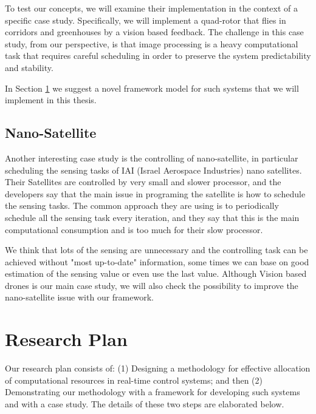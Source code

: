 \documentclass[11pt]{article}
\begin{document}
To test our concepts, we will examine their implementation in the context of a specific case study. Specifically, we will implement a quad-rotor that flies in corridors and greenhouses by a vision based feedback. The challenge in this case study, from our perspective, is that image processing is a heavy computational task that requires careful scheduling in order to preserve the system predictability and stability.

In Section \ref{sec:Research Plan} we suggest a novel framework model for such systems that we will implement in this thesis.

\subsection{Nano-Satellite}
Another interesting case study is the controlling of nano-satellite, in particular scheduling the sensing tasks of IAI (Israel Aerospace Industries) nano satellites. Their Satellites are controlled by very small and slower processor, and the developers say that the main issue in programing the satellite is how to schedule the sensing tasks.
The common approach they are using is to periodically schedule all the sensing task every iteration, and they say that this is the main computational consumption and is too much for their slow processor.

We think that lots of the sensing are unnecessary and the controlling task can be achieved without "most up-to-date" information, some times we can base on good estimation of the sensing value or even use the last value. Although Vision based drones is our main case study, we will also check the possibility to improve the nano-satellite issue with our framework.

\section{Research Plan}
\label{sec:Research Plan}

Our research plan consists of: (1) Designing a methodology for effective allocation of computational resources in real-time control systems; and then (2) Demonstrating our methodology with a framework for developing such systems and with a case study. The details of these two steps are elaborated below.
\end{document}
